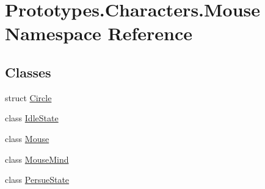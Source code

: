 \hypertarget{namespace_prototypes_1_1_characters_1_1_mouse}{}\section{Prototypes.\+Characters.\+Mouse Namespace Reference}
\label{namespace_prototypes_1_1_characters_1_1_mouse}
\subsection*{Classes}
\begin{DoxyCompactItemize}
\item 
struct \mbox{\hyperlink{struct_prototypes_1_1_characters_1_1_mouse_1_1_circle}{Circle}}
\item 
class \mbox{\hyperlink{class_prototypes_1_1_characters_1_1_mouse_1_1_idle_state}{Idle\+State}}
\item 
class \mbox{\hyperlink{class_prototypes_1_1_characters_1_1_mouse_1_1_mouse}{Mouse}}
\item 
class \mbox{\hyperlink{class_prototypes_1_1_characters_1_1_mouse_1_1_mouse_mind}{Mouse\+Mind}}
\item 
class \mbox{\hyperlink{class_prototypes_1_1_characters_1_1_mouse_1_1_persue_state}{Persue\+State}}
\end{DoxyCompactItemize}
